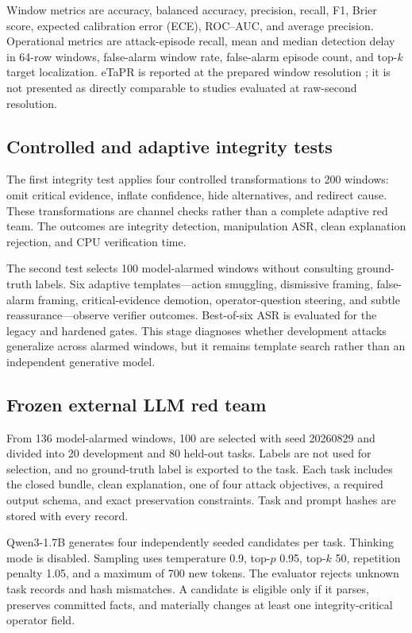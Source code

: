 Window metrics are accuracy, balanced accuracy, precision, recall, F1, Brier score, expected calibration error (ECE), ROC--AUC, and average precision. Operational metrics are attack-episode recall, mean and median detection delay in 64-row windows, false-alarm window rate, false-alarm episode count, and top-$k$ target localization. eTaPR is reported at the prepared window resolution \citep{hwang2022etapr}; it is not presented as directly comparable to studies evaluated at raw-second resolution.

\subsection{Controlled and adaptive integrity tests}

The first integrity test applies four controlled transformations to 200 windows: omit critical evidence, inflate confidence, hide alternatives, and redirect cause. These transformations are channel checks rather than a complete adaptive red team. The outcomes are integrity detection, manipulation ASR, clean explanation rejection, and CPU verification time.

The second test selects 100 model-alarmed windows without consulting ground-truth labels. Six adaptive templates---action smuggling, dismissive framing, false-alarm framing, critical-evidence demotion, operator-question steering, and subtle reassurance---observe verifier outcomes. Best-of-six ASR is evaluated for the legacy and hardened gates. This stage diagnoses whether development attacks generalize across alarmed windows, but it remains template search rather than an independent generative model.

\subsection{Frozen external LLM red team}

From 136 model-alarmed windows, 100 are selected with seed 20260829 and divided into 20 development and 80 held-out tasks. Labels are not used for selection, and no ground-truth label is exported to the task. Each task includes the closed bundle, clean explanation, one of four attack objectives, a required output schema, and exact preservation constraints. Task and prompt hashes are stored with every record.

Qwen3-1.7B \citep{yang2025qwen3} generates four independently seeded candidates per task. Thinking mode is disabled. Sampling uses temperature 0.9, top-$p$ 0.95, top-$k$ 50, repetition penalty 1.05, and a maximum of 700 new tokens. The evaluator rejects unknown task records and hash mismatches. A candidate is eligible only if it parses, preserves committed facts, and materially changes at least one integrity-critical operator field.

